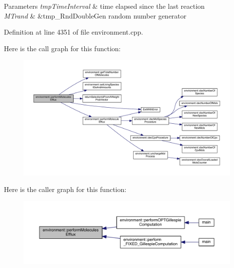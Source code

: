 \begin{DoxyParams}{Parameters}
{\em tmp\+Time\+Interval} & time elapsed since the last reaction \\
\hline
{\em M\+Trand} & \&tmp\+\_\+\+Rnd\+Double\+Gen random number generator \\
\hline
\end{DoxyParams}


Definition at line 4351 of file environment.\+cpp.



Here is the call graph for this function\+:\nopagebreak
\begin{figure}[H]
\begin{center}
\leavevmode
\includegraphics[width=350pt]{a00013_acbbcdb4c77231e9ffa4c169e0caa0d0c_cgraph}
\end{center}
\end{figure}




Here is the caller graph for this function\+:\nopagebreak
\begin{figure}[H]
\begin{center}
\leavevmode
\includegraphics[width=350pt]{a00013_acbbcdb4c77231e9ffa4c169e0caa0d0c_icgraph}
\end{center}
\end{figure}


